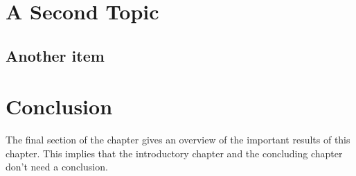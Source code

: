 \section{A Second Topic}


\subsection{Another item}


\section{Conclusion}
The final section of the chapter gives an overview of the important results
of this chapter. This implies that the introductory chapter and the
concluding chapter don't need a conclusion.



